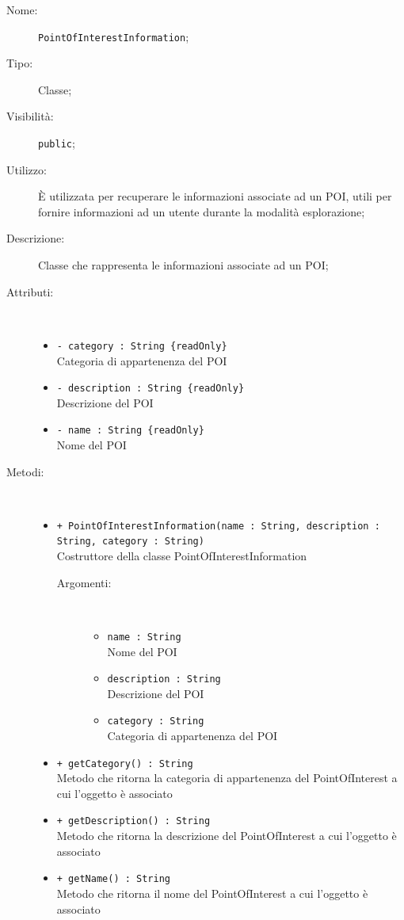 \documentclass[../DefinizioneDiProdotto.tex]{subfiles}
\begin{document}
\begin{description}
	\item[Nome:] \texttt{PointOfInterestInformation};
	\item[Tipo:] Classe;
	\item[Visibilità:] \texttt{public};
	\item[Utilizzo:] È utilizzata per recuperare le informazioni associate ad un POI, utili per fornire informazioni ad un utente durante la modalità esplorazione;
	\item[Descrizione:] Classe che rappresenta le informazioni associate ad un POI;
	\item[Attributi:] \
	\begin{itemize}
		\item \texttt{- category : String  \{readOnly\}}\\
		Categoria di appartenenza del POI
		
		\item \texttt{- description : String  \{readOnly\}}\\
		Descrizione del POI
		
		\item \texttt{- name : String  \{readOnly\}}\\
		Nome del POI
		
	\end{itemize}
	\item[Metodi:] \
	\begin{itemize}
		\item \texttt{+ PointOfInterestInformation(name : String, description : String, category : String)}\\
		Costruttore della classe PointOfInterestInformation
		\begin{description}
			\item[Argomenti:] \
			\begin{itemize}
				\item \texttt{name : String}\\
				Nome del POI\item \texttt{description : String}\\
				Descrizione del POI\item \texttt{category : String}\\
				Categoria di appartenenza del POI\end{itemize}
		\end{description}
		\item \texttt{+ getCategory() : String}\\
		Metodo che ritorna la categoria di appartenenza del PointOfInterest a cui l'oggetto è associato
		\item \texttt{+ getDescription() : String}\\
		Metodo che ritorna la descrizione del PointOfInterest a cui l'oggetto è associato
		\item \texttt{+ getName() : String}\\
		Metodo che ritorna il nome del PointOfInterest a cui l'oggetto è associato
	\end{itemize}
\end{description}
\end{document}
